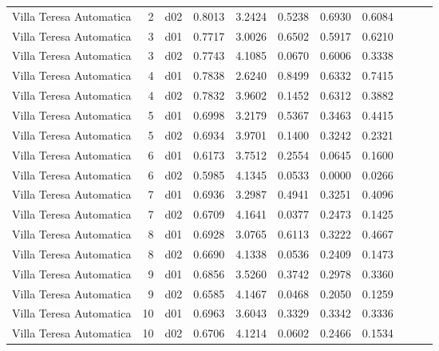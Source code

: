 \begin{landscape}
\begin{longtable}{p{2cm}rrrrrrrrrr}
 Villa Teresa Automatica  &          2 &     d02 &   0.8013 &  3.2424 &        0.5238 &           0.6930 &  0.6084 \\
 Villa Teresa Automatica  &          3 &     d01 &   0.7717 &  3.0026 &        0.6502 &           0.5917 &  0.6210 \\
 Villa Teresa Automatica  &          3 &     d02 &   0.7743 &  4.1085 &        0.0670 &           0.6006 &  0.3338 \\
 Villa Teresa Automatica  &          4 &     d01 &   0.7838 &  2.6240 &        0.8499 &           0.6332 &  0.7415 \\
 Villa Teresa Automatica  &          4 &     d02 &   0.7832 &  3.9602 &        0.1452 &           0.6312 &  0.3882 \\
 Villa Teresa Automatica  &          5 &     d01 &   0.6998 &  3.2179 &        0.5367 &           0.3463 &  0.4415 \\
 Villa Teresa Automatica  &          5 &     d02 &   0.6934 &  3.9701 &        0.1400 &           0.3242 &  0.2321 \\
 Villa Teresa Automatica  &          6 &     d01 &   0.6173 &  3.7512 &        0.2554 &           0.0645 &  0.1600 \\
 Villa Teresa Automatica  &          6 &     d02 &   0.5985 &  4.1345 &        0.0533 &           0.0000 &  0.0266 \\
 Villa Teresa Automatica  &          7 &     d01 &   0.6936 &  3.2987 &        0.4941 &           0.3251 &  0.4096 \\
 Villa Teresa Automatica  &          7 &     d02 &   0.6709 &  4.1641 &        0.0377 &           0.2473 &  0.1425 \\
 Villa Teresa Automatica  &          8 &     d01 &   0.6928 &  3.0765 &        0.6113 &           0.3222 &  0.4667 \\
 Villa Teresa Automatica  &          8 &     d02 &   0.6690 &  4.1338 &        0.0536 &           0.2409 &  0.1473 \\
 Villa Teresa Automatica  &          9 &     d01 &   0.6856 &  3.5260 &        0.3742 &           0.2978 &  0.3360 \\
 Villa Teresa Automatica  &          9 &     d02 &   0.6585 &  4.1467 &        0.0468 &           0.2050 &  0.1259 \\
 Villa Teresa Automatica  &         10 &     d01 &   0.6963 &  3.6043 &        0.3329 &           0.3342 &  0.3336 \\
 Villa Teresa Automatica  &         10 &     d02 &   0.6706 &  4.1214 &        0.0602 &           0.2466 &  0.1534 \\

\end{longtable}
\end{landscape}
